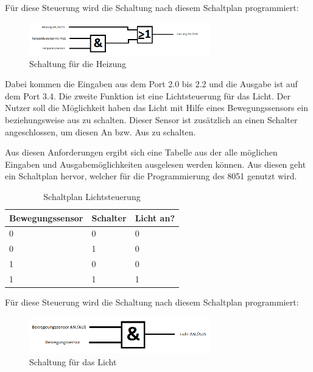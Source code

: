 Für diese Steuerung wird die Schaltung nach diesem Schaltplan programmiert:

\begin{figure}[htbp] 
  \centering
     \includegraphics[width=0.7\textwidth]{Heizungsschaltung.png}
  \caption{Schaltung für die Heizung}
  \label{fig:Bild1}
\end{figure}

Dabei kommen die Eingaben aus dem Port 2.0 bis 2.2 und die Ausgabe ist auf dem Port 3.4.
Die zweite Funktion ist eine Lichtsteuerung für das Licht. Der Nutzer soll die Möglichkeit haben das Licht mit Hilfe eines Bewegungssensors ein beziehungsweise aus zu schalten. Dieser Sensor ist zusätzlich an einen Schalter angeschlossen, um diesen An bzw. Aus zu schalten.
 
Aus diesen Anforderungen ergibt sich eine Tabelle aus der alle möglichen Eingaben und Ausgabemöglichkeiten ausgelesen werden können. Aus diesen geht ein Schaltplan hervor, welcher für die Programmierung des 8051 genutzt wird.

\begin{table}[htbp]
\centering
\caption{Schaltplan Lichtsteuerung}
\label{my-label}
\begin{tabular}{|l|l|l|}
\hline
\multicolumn{1}{|c|}{\textbf{Bewegungssensor}} & \multicolumn{1}{c|}{\textbf{Schalter}} & \multicolumn{1}{c|}{\textbf{Licht an?}} \\ \hline
 0 & 0 & 0 \\ \hline
 0 & 1 & 0 \\ \hline
 1 & 0 & 0 \\ \hline
 1 & 1 & 1 \\ \hline
\end{tabular}
\end{table}

Für diese Steuerung wird die Schaltung nach diesem Schaltplan programmiert:

\begin{figure}[htbp] 
  \centering
     \includegraphics[width=0.7\textwidth]{Lichtschaltung.png}
  \caption{Schaltung für das Licht}
  \label{fig:Bild2}
\end{figure}

